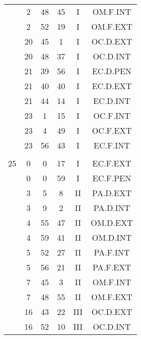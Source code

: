 \documentclass[12pt, a4paper]{article}
\begin{document}
\begin{multicols}{3}
{\begin{tabular}{c c c c c c}
	 	 	 	 & 2 & 48 & 45 & I & OM.F.INT\\%
	 	 	 	 & 2 & 52 & 19 & I & OM.F.EXT\\%
	 	 	 	 & 20 & 45 & 1 & I & OC.D.EXT\\%
	 	 	 	 & 20 & 48 & 37 & I & OC.D.INT\\%
	 	 	 	 & 21 & 39 & 56 & I & EC.D.PEN\\%
	 	 	 	 & 21 & 40 & 40 & I & EC.D.EXT\\%
	 	 	 	 & 21 & 44 & 14 & I & EC.D.INT\\%
	 	 	 	 & 23 & 1 & 15 & I & OC.F.INT\\%
	 	 	 	 & 23 & 4 & 49 & I & OC.F.EXT\\%
	 	 	 	 & 23 & 56 & 43 & I & EC.F.INT\\%
	 	 	 	 & & & & & \\%
	 	 	 	25 & 0 & 0 & 17 & I & EC.F.EXT\\%
	 	 	 	 & 0 & 0 & 59 & I & EC.F.PEN\\%
	 	 	 	 & 3 & 5 & 8 & II & PA.D.EXT\\%
	 	 	 	 & 3 & 9 & 2 & II & PA.D.INT\\%
	 	 	 	 & 4 & 55 & 47 & II & OM.D.EXT\\%
	 	 	 	 & 4 & 59 & 41 & II & OM.D.INT\\%
	 	 	 	 & 5 & 52 & 27 & II & PA.F.INT\\%
	 	 	 	 & 5 & 56 & 21 & II & PA.F.EXT\\%
	 	 	 	 & 7 & 45 & 3 & II & OM.F.INT\\%
	 	 	 	 & 7 & 48 & 55 & II & OM.F.EXT\\%
	 	 	 	 & 16 & 43 & 22 & III & OC.D.EXT\\%
	 	 	 	 & 16 & 52 & 10 & III & OC.D.INT\\%

\end{tabular}}
\end{multicols}
\end{document}
